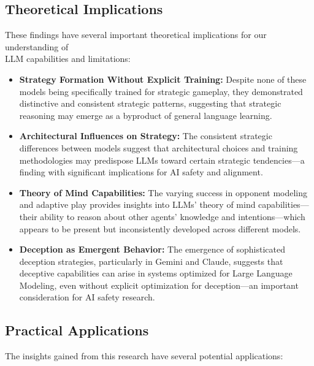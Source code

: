 \documentclass{article}
\begin{document}
\subsection{Theoretical Implications}
These findings have several important theoretical implications for our understanding of \\ LLM capabilities and limitations:

\begin{itemize}
    \item \textbf{Strategy Formation Without Explicit Training:} Despite none of these models being 
    specifically trained for strategic gameplay, they demonstrated distinctive and consistent
    strategic patterns, suggesting that strategic reasoning may emerge as a byproduct of general 
    language learning.
    
    \item \textbf{Architectural Influences on Strategy:} The consistent strategic differences 
    between models suggest that architectural choices and training methodologies may predispose
    LLMs toward certain strategic tendencies—a finding with significant implications for 
    AI safety and alignment.
    
    \item \textbf{Theory of Mind Capabilities:} The varying success in opponent modeling and 
    adaptive play provides insights into LLMs' theory of mind capabilities—their ability to
    reason about other agents' knowledge and intentions—which appears to be present but 
    inconsistently developed across different models.
    
    \item \textbf{Deception as Emergent Behavior:} The emergence of sophisticated deception 
    strategies, particularly in Gemini and Claude, suggests that deceptive capabilities
    can arise in systems optimized for Large Language Modeling, even without explicit optimization
    for deception—an important consideration for AI safety research.
\end{itemize}

\subsection{Practical Applications}
The insights gained from this research have several potential applications:
\end{document}
